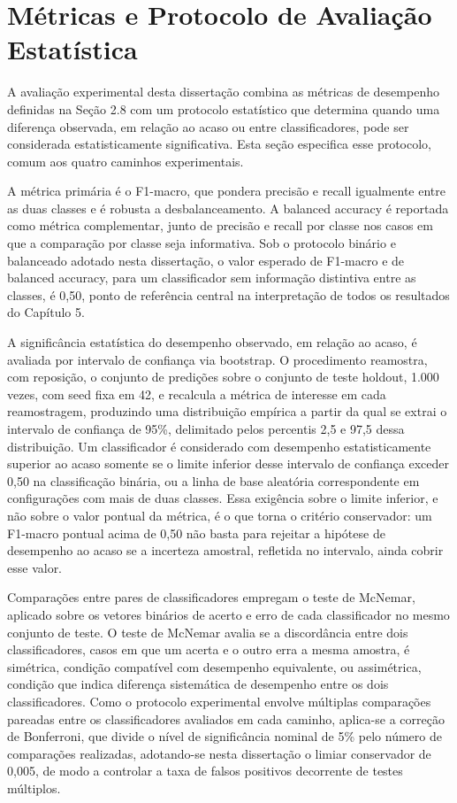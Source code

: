 \section{Métricas e Protocolo de Avaliação Estatística}
\label{sec:metricas-validacao}

A avaliação experimental desta dissertação combina as métricas de desempenho definidas na Seção 2.8 com um protocolo estatístico que determina quando uma diferença observada, em relação ao acaso ou entre classificadores, pode ser considerada estatisticamente significativa. Esta seção especifica esse protocolo, comum aos quatro caminhos experimentais.

A métrica primária é o F1-macro, que pondera precisão e recall igualmente entre as duas classes e é robusta a desbalanceamento. A balanced accuracy é reportada como métrica complementar, junto de precisão e recall por classe nos casos em que a comparação por classe seja informativa. Sob o protocolo binário e balanceado adotado nesta dissertação, o valor esperado de F1-macro e de balanced accuracy, para um classificador sem informação distintiva entre as classes, é 0,50, ponto de referência central na interpretação de todos os resultados do Capítulo 5.

A significância estatística do desempenho observado, em relação ao acaso, é avaliada por intervalo de confiança via bootstrap. O procedimento reamostra, com reposição, o conjunto de predições sobre o conjunto de teste holdout, 1.000 vezes, com seed fixa em 42, e recalcula a métrica de interesse em cada reamostragem, produzindo uma distribuição empírica a partir da qual se extrai o intervalo de confiança de 95\%, delimitado pelos percentis 2,5 e 97,5 dessa distribuição. Um classificador é considerado com desempenho estatisticamente superior ao acaso somente se o limite inferior desse intervalo de confiança exceder 0,50 na classificação binária, ou a linha de base aleatória correspondente em configurações com mais de duas classes. Essa exigência sobre o limite inferior, e não sobre o valor pontual da métrica, é o que torna o critério conservador: um F1-macro pontual acima de 0,50 não basta para rejeitar a hipótese de desempenho ao acaso se a incerteza amostral, refletida no intervalo, ainda cobrir esse valor.

Comparações entre pares de classificadores empregam o teste de McNemar, aplicado sobre os vetores binários de acerto e erro de cada classificador no mesmo conjunto de teste. O teste de McNemar avalia se a discordância entre dois classificadores, casos em que um acerta e o outro erra a mesma amostra, é simétrica, condição compatível com desempenho equivalente, ou assimétrica, condição que indica diferença sistemática de desempenho entre os dois classificadores. Como o protocolo experimental envolve múltiplas comparações pareadas entre os classificadores avaliados em cada caminho, aplica-se a correção de Bonferroni, que divide o nível de significância nominal de 5\% pelo número de comparações realizadas, adotando-se nesta dissertação o limiar conservador de 0,005, de modo a controlar a taxa de falsos positivos decorrente de testes múltiplos.

